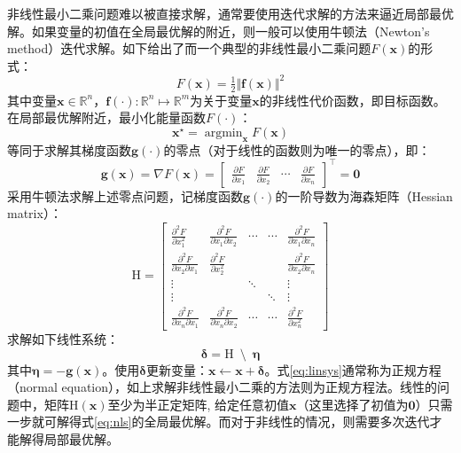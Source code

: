 非线性最小二乘问题难以被直接求解，通常要使用迭代求解的方法来逼近局部最优解。如果变量的初值在全局最优解的附近，则一般可以使用牛顿法（Newton's method）迭代求解。如下给出了而一个典型的非线性最小二乘问题$F(\bm{x})$的形式：
\begin{equation}
    F(\bm{x}) = \tfrac{1}{2} \Vert \bm{f}(\bm{x}) \Vert^2
\label{eq:nls}
\end{equation}
其中变量$\bm{x}\in\mathbb{R}^n$，$\bm{f}(\cdot):\mathbb{R}^n\mapsto\mathbb{R}^m$为关于变量$\bm{x}$的非线性代价函数，即目标函数。在局部最优解附近，最小化能量函数$F(\cdot)$：
\begin{equation}
    \bm{x}^\star = \mathop{\arg\min}_{\bm{x}} F(\bm{x})
\end{equation}
等同于求解其梯度函数$\bm{g}(\cdot)$的零点（对于线性的函数则为唯一的零点），即：
\begin{equation}
    \bm{g}(\bm{x}) = \nabla F(\bm{x}) = \begin{bmatrix}
        \frac{\partial F}{\partial x_1} &
        \frac{\partial F}{\partial x_2} &
        \cdots &
        \frac{\partial F}{\partial x_n}
    \end{bmatrix}^\top = \bm{0}
\end{equation}
采用牛顿法求解上述零点问题，记梯度函数$\bm{g}(\cdot)$的一阶导数为海森矩阵（Hessian matrix）：
\begin{equation}
    \mathrm{H} = \begin{bmatrix}
        \frac{\partial^2 F}{\partial x_1^2} &
        \frac{\partial^2 F}{\partial x_1 \partial x_2} &
        \cdots & \cdots &
        \frac{\partial^2 F}{\partial x_1 \partial x_n} \\
        \frac{\partial^2 F}{\partial x_2 \partial x_1} &
        \frac{\partial^2 F}{\partial x_2^2} &
        & &
        \frac{\partial^2 F}{\partial x_2 \partial x_n} \\
        \vdots & & \ddots & & \vdots \\
        \vdots & & & \ddots & \vdots \\
        \frac{\partial^2 F}{\partial x_n \partial x_1} &
        \frac{\partial^2 F}{\partial x_n \partial x_2} &
        \cdots & \cdots &
        \frac{\partial^2 F}{\partial x_n^2}
    \end{bmatrix}
\end{equation}
求解如下线性系统：
\begin{equation}
    \bm{\delta} = \mathrm{H} \enspace\setminus\enspace \bm{\eta}
    \label{eq:linsys}
\end{equation}
其中$\bm{\eta}=-\bm{g}(\bm{x})$。使用$\bm{\delta}$更新变量：$\bm{x}\leftarrow\bm{x}+\bm{\delta}$。式\eqref{eq:linsys}通常称为正规方程（normal equation），如上求解非线性最小二乘的方法则为正规方程法。线性的问题中，矩阵$\mathrm{H}(\bm{x})$至少为半正定矩阵, 给定任意初值$\bm{x}$（这里选择了初值为$\bm{0}$）只需一步就可解得式\eqref{eq:nls}的全局最优解。而对于非线性的情况，则需要多次迭代才能解得局部最优解。

